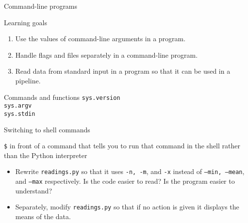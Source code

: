 \documentclass{beamer}
\begin{document}

\begin{frame}{Command-line programs}
\begin{block}{Learning goals}
\begin{enumerate}
       \item{Use the values of command-line arguments in a program.}
    \item{Handle flags and files separately in a command-line program.}
    \item{Read data from standard input in a program so that it can be used in a pipeline.}
 \end{enumerate}
 \end{block}
 \begin{block}{Commands and functions}
  \texttt{sys.version \\
  sys.argv\\
  sys.stdin}
 \end{block}
\end{frame}



\begin{frame}{Switching to shell commands}

 \textcolor{verde}{\texttt{\$}} in front of a command that tells you to run that command in the shell rather than the Python interpreter
%

\end{frame}


\begin{frame}{ }
\begin{itemize}
\item Rewrite \texttt{readings.py} so that it uses \texttt{-n, -m}, and \texttt{-x} instead of \texttt{--min, --mean}, and \texttt{--max} respectively. Is the code easier to read? Is the program easier to understand?


\item Separately, modify \texttt{readings.py} so that if no action is given it displays the means of the data.
\end{itemize}
\end{frame}


\end{document}
